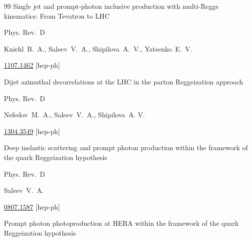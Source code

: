 \begin{thebibliography}{99}
\paper Single jet and prompt-photon inclusive production with multi-Regge kinematics: From Tevatron to LHC


\jour Phys. Rev.~D 



\by Kniehl~B.~A., Saleev~V.~A.,  Shipilova~A.~V.,  Yatsenko~E.~V.



\arxiv \href{http://arxiv.org/abs/1107.1462}{1107.1462} [hep-ph]




\paper Dijet azimuthal decorrelations at the LHC in the parton Reggeization approach


\jour Phys. Rev.~D 



\by Nefedov~M.~A.,  Saleev~V.~A., Shipilova~A. V.



\arxiv \href{http://arxiv.org/abs/1304.3549}{1304.3549} [hep-ph]






\paper Deep inelastic scattering and prompt photon production within the framework of the quark Reggeization hypothesis


\jour Phys. Rev.~D 



\by Saleev~V.~A.



\arxiv \href{http://arxiv.org/abs/0807.1587}{0807.1587} [hep-ph]

  

  

  


\paper Prompt photon photoproduction at HERA within the framework of the quark Reggeization hypothesis


\end{thebibliography}
